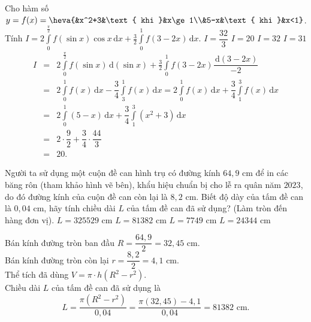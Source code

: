 \begin{ex}%
Cho hàm số $y=f(x)=\heva{&x^2+3&\text{ khi }&x\ge 1\\&5-x&\text{ khi }&x<1}$.\\
Tính $I=2\displaystyle\int\limits_0^{\frac{\pi}{2}} f(\sin x)\cos x\mathrm{\, d}x+\frac{3}{2}\displaystyle\int\limits_0^1f(3-2x)\mathrm{\, d}x$.
\choice
{$I=\dfrac{32}{3}$}
{\True $I=20$}
{$I=32$}
{$I=31$}
\loigiai
{
\begin{eqnarray*}
I&=&2\displaystyle\int\limits_0^{\frac{\pi}{2}} f(\sin x)\mathrm{\, d}(\sin x)+\frac{3}{2}\displaystyle\int\limits_0^1f(3-2x)\dfrac{\mathrm{\, d}(3-2x)}{-2}\\
&=&2\displaystyle\int\limits_0^1 f(x)\mathrm{\, d}x-\dfrac{3}{4}\displaystyle\int\limits_3^1 f(x)\mathrm{\, d}x=2\displaystyle\int\limits_0^1 f(x)\mathrm{\, d}x+\dfrac{3}{4}\displaystyle\int\limits_1^3 f(x)\mathrm{\, d}x\\
&=&2\displaystyle\int\limits_0^1 (5-x)\mathrm{\, d}x+\dfrac{3}{4}\displaystyle\int\limits_1^3 (x^2+3)\mathrm{\, d}x\\
&=&2\cdot\dfrac{9}{2}+\dfrac{3}{4}\cdot\dfrac{44}{3}\\
&=&20.
\end{eqnarray*}
}
\end{ex}

\begin{ex}%
\immini
{
Người ta sử dụng một cuộn đề can hình trụ có đường kính $64{,}9$ cm để in các băng rôn (tham khảo hình vẽ bên), khẩu hiệu chuẩn bị cho lễ ra quân năm $2023$, do đó đường kính của cuộn đề can còn lại là $8{,}2$ cm. Biết độ dày của tấm đề can là $0{,}04$ cm, hãy tính chiều dài $L$ của tấm đề can đã sử dụng? (Làm tròn đến hàng đơn vị).
\choice
{$L=325529$ cm}
{\True $L=81382$ cm}
{$L=7749$ cm}
{$L=24344$ cm}
}
{
}
\loigiai
{
Bán kính đường tròn ban đầu $R=\dfrac{64{,}9}{2}=32{,}45$ cm.\\
Bán kính đường tròn còn lại $r=\dfrac{8{,}2}{2}=4{,}1$ cm.\\
Thể tích đã dùng $V=\pi\cdot h(R^2-r^2)$.\\
Chiều dài $L$ của tấm đề can đã sử dụng là
\[L=\dfrac{\pi(R^2-r^2)}{0{,}04}=\dfrac{\pi(32{,}45)-4{,}1}{0{,}04}=81382\text{ cm}.\]
}
\end{ex}

